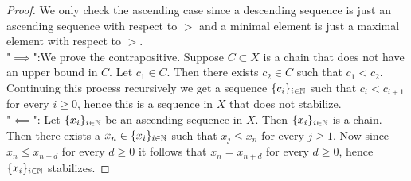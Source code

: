 \begin{proof}
    We only check the ascending case since a descending sequence is just an ascending sequence with respect to $>$ and a minimal element is just a maximal element with respect to $>$.\\
    "$\implies$":We prove the contrapositive. Suppose $C\subset X$ is a chain that does not have an upper bound in $C$. Let $c_1\in C$. Then there exists $c_2 \in C$ such that $c_1 < c_2$. Continuing this process recursively we get a sequence $\{c_i\}_{i\in \mathbb{N}}$ such that $c_i<c_{i+1}$ for every $i\geq 0$, hence this is a sequence in $X$ that does not stabilize.\\
    "$\impliedby$": Let $\{x_i\}_{i\in \mathbb{N}}$ be an ascending sequence in $X$. Then $\{x_i\}_{i\in \mathbb{N}}$ is a chain. Then there exists a $x_n\in \{x_i\}_{i\in \mathbb{N}}$ such that $x_j\leq x_n$ for every $j\geq 1$. Now since $x_n \leq x_{n+d}$ for every $d\geq 0$ it follows that $x_n=x_{n+d}$ for every $d\geq0$, hence $\{x_i\}_{i\in \mathbb{N}}$ stabilizes. 
\end{proof}
